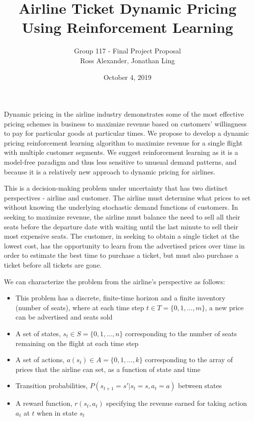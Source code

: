 \documentclass[]{article}
\title{\textbf{\Large Airline Ticket Dynamic Pricing Using Reinforcement Learning}}
\author{Group 117 - Final Project Proposal \\ Ross Alexander, Jonathan Ling}
\date{October 4, 2019}
\begin{document}
\maketitle


Dynamic pricing in the airline industry demonstrates some of the most effective pricing schemes in business to maximize revenue based on customers' willingness to pay for particular goods at particular times. We propose to develop a dynamic pricing reinforcement learning algorithm to maximize revenue for a single flight with multiple customer segments. We suggest reinforcement learning as it is a model-free paradigm and thus less sensitive to unusual demand patterns, and because it is a relatively new approach to dynamic pricing for airlines.

This is a decision-making problem under uncertainty that has two distinct perspectives - airline and customer. The airline must determine what prices to set without knowing the underlying stochastic demand functions of customers. In seeking to maximize revenue, the airline must balance the need to sell all their seats before the departure date with waiting until the last minute to sell their most expensive seats. The customer, in seeking to obtain a single ticket at the lowest cost, has the opportunity to learn from the advertised prices over time in order to estimate the best time to purchase a ticket, but must also purchase a ticket before all tickets are gone.

We can characterize the problem from the airline's perspective as follows:
\begin{itemize}
  \item This problem has a discrete, finite-time horizon and a finite inventory (number of seats), where at each time step $t \in T = \{0,1,...,m\}$, a new price can be advertised and seats sold
  \item A set of states, $s_t \in S = \{0,1,...,n\}$ corresponding to the number of seats remaining on the flight at each time step
  \item A set of actions, $a(s_{t}) \in A = \{0,1,...,k\}$ corresponding to the array of prices that the airline can set, as a function of state and time
  \item Transition probabilities, $P(s_{t+1} = s' | s_t = s, a_t = a)$ between states
  \item A reward function, $r(s_t,a_t)$ specifying the revenue earned for taking action $a_t$ at $t$ when in state $s_t$
\end{itemize}
\end{document}
